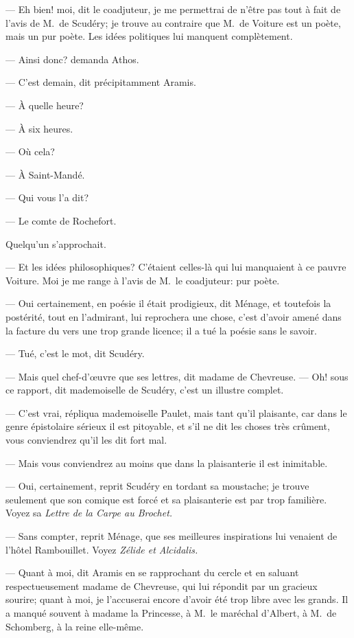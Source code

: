 — Eh bien! moi, dit le coadjuteur, je me permettrai de n'être pas tout à fait de l'avis de M.~de Scudéry; je trouve au contraire que M.~de Voiture est un poète, mais un pur poète. Les idées politiques lui manquent complètement.

— Ainsi donc? demanda Athos.

— C'est demain, dit précipitamment Aramis.

— À quelle heure?

— À six heures.

— Où cela?

— À Saint-Mandé.

— Qui vous l'a dit?

— Le comte de Rochefort.

Quelqu'un s'approchait.

— Et les idées philosophiques? C'étaient celles-là qui lui manquaient à ce pauvre Voiture. Moi je me range à l'avis de M.~le coadjuteur: pur poète.

— Oui certainement, en poésie il était prodigieux, dit Ménage, et toutefois la postérité, tout en l'admirant, lui reprochera une chose, c'est d'avoir amené dans la facture du vers une trop grande licence; il a tué la poésie sans le savoir.

— Tué, c'est le mot, dit Scudéry.

— Mais quel chef-d'œuvre que ses lettres, dit madame de Chevreuse.
— Oh! sous ce rapport, dit mademoiselle de Scudéry, c'est un illustre complet.

— C'est vrai, répliqua mademoiselle Paulet, mais tant qu'il plaisante, car dans le genre épistolaire sérieux il est pitoyable, et s'il ne dit les choses très crûment, vous conviendrez qu'il les dit fort mal.

— Mais vous conviendrez au moins que dans la plaisanterie il est inimitable.

— Oui, certainement, reprit Scudéry en tordant sa moustache; je trouve seulement que son comique est forcé et sa plaisanterie est par trop familière. Voyez sa \textit{Lettre de la Carpe au Brochet.}

— Sans compter, reprit Ménage, que ses meilleures inspirations lui venaient de l'hôtel Rambouillet. Voyez \textit{Zélide et Alcidalis.}

— Quant à moi, dit Aramis en se rapprochant du cercle et en saluant respectueusement madame de Chevreuse, qui lui répondit par un gracieux sourire; quant à moi, je l'accuserai encore d'avoir été trop libre avec les grands. Il a manqué souvent à madame la Princesse, à M.~le maréchal d'Albert, à M.~de Schomberg, à la reine elle-même.

